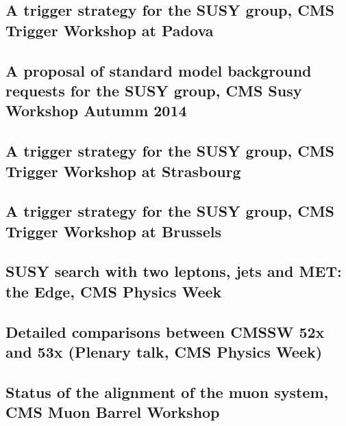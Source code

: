 \documentclass[a4paper, 11pt, twoside, openright]{report}
\begin{document}
\subsection{A trigger strategy for the SUSY group, CMS Trigger Workshop at Padova}


\subsection{A proposal of standard model background requests for the SUSY group, CMS Susy Workshop Autumm 2014}


\subsection{A trigger strategy for the SUSY group, CMS Trigger Workshop at Strasbourg}


\subsection{A trigger strategy for the SUSY group, CMS Trigger Workshop at Brussels}


\subsection{SUSY search with two leptons, jets and MET: the Edge, CMS Physics Week}


\subsection{Detailed comparisons between CMSSW 52x and 53x (Plenary talk, CMS Physics Week)}


\subsection{Status of the alignment of the muon system, CMS Muon Barrel Workshop}

\end{document}
